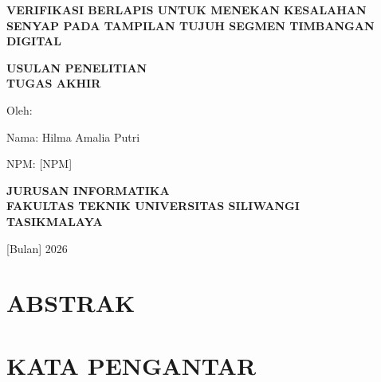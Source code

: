 \documentclass[12pt,a4paper,oneside]{report}
\renewcommand{\thepage}{\Roman{chapter}-\arabic{page}}
\newcommand{\JudulTA}{VERIFIKASI BERLAPIS UNTUK MENEKAN KESALAHAN SENYAP
  PADA TAMPILAN TUJUH SEGMEN TIMBANGAN DIGITAL}
\newcommand{\NamaPenulis}{Hilma Amalia Putri}
\newcommand{\NPMPenulis}{[NPM]}
\newcommand{\BulanTahun}{[Bulan] 2026}
\begin{document}
\begin{titlepage}
  \centering
  \vspace*{1cm}
  {\bfseries\normalsize \JudulTA \par}
  \vspace{2cm}
  {\bfseries\normalsize USULAN PENELITIAN\\TUGAS AKHIR\par}
  \vspace{2cm}
  {\normalsize Oleh:\par}
  \vspace{0.5cm}
  {\normalsize Nama: \NamaPenulis\par}
  {\normalsize NPM: \NPMPenulis\par}
  \vspace{1.5cm}
  {\bfseries\normalsize JURUSAN INFORMATIKA\\[0.2cm]
   FAKULTAS TEKNIK UNIVERSITAS SILIWANGI\\[0.2cm]
   TASIKMALAYA\par}
  \vspace{1cm}
  {\normalsize \BulanTahun\par}
\end{titlepage}

\pagestyle{plain}

\chapter*{ABSTRAK}
\singlespacing

\doublespacing

\chapter*{KATA PENGANTAR}


\clearpage
\tableofcontents
\clearpage
\listoftables
\clearpage
\listoffigures

\clearpage
{}
\renewcommand{\thepage}{\Roman{chapter}-\arabic{page}}
\pagestyle{isita}





\clearpage
\renewcommand{\thepage}{\arabic{page}}
\setcounter{page}{1}

\end{document}
